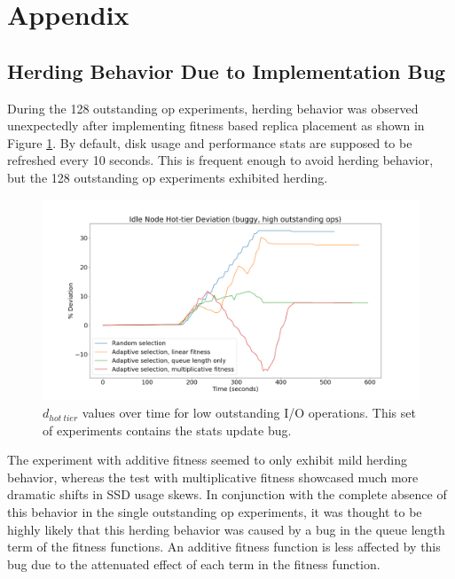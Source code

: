\documentclass[12pt]{article}
\begin{document}
\section{Appendix}

  \subsection{Herding Behavior Due to Implementation Bug}

  During the 128 outstanding op experiments, herding behavior
  was observed unexpectedly after implementing fitness based replica placement
  as shown in Figure \ref{fig:herding_bug}. By default, disk usage and
  performance stats are supposed to be refreshed every 10 seconds. This is
  frequent enough to avoid herding behavior, but the 128 outstanding op
  experiments exhibited herding.

  \begin{figure}[h]
    \centering
    \includegraphics[scale=0.30]{images/buggy.png} 
    \caption{$d_{hot\ tier}$ values over time for low outstanding I/O
             operations. This set of experiments contains the stats update bug.}
    \label{fig:herding_bug}
  \end{figure}

  The experiment with additive fitness seemed to only exhibit mild herding
  behavior, whereas the test with multiplicative fitness showcased much more
  dramatic shifts in SSD usage skews. In conjunction with the complete absence
  of this behavior in the single outstanding op experiments, it was thought to
  be highly likely that this herding behavior was caused by a bug in the queue
  length term of the fitness functions. An additive fitness function is less
  affected by this bug due to the attenuated effect of each term in the fitness
  function.
\end{document}
